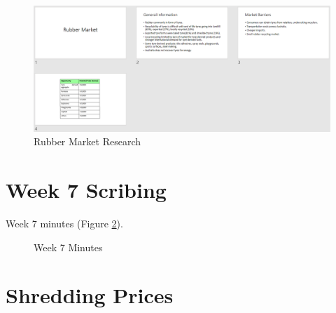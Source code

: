 \documentclass[11pt, a4, nocenter, margin=150mm]{article}
\begin{document}
\begin{appendices}
	\begin{figure}[h!]
		\centering
		\includegraphics[width=\textwidth]{week4/business_research_rubber.png}
		\caption{Rubber Market Research}
		\label{fig:rubber}
	\end{figure}

\pagebreak

\section{Week 7 Scribing}
\label{app:week7_scribe}

	Week 7 minutes (Figure \ref{fig:week7_scribe}).

	\begin{figure}[h!]
		\centering
		\caption{Week 7 Minutes}
		\label{fig:week7_scribe}
	\end{figure}

\pagebreak

\section{Shredding Prices}
\label{app:shred}


\end{appendices}
\end{document}
